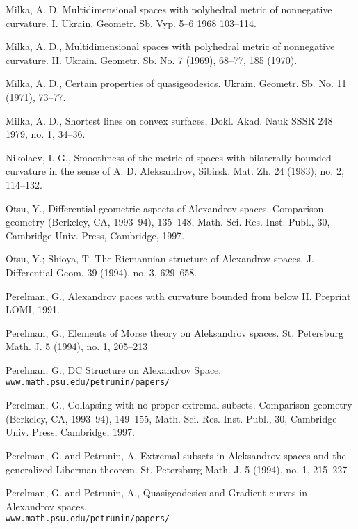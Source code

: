 \documentclass{article}
\begin{document}
\begin{thebibliography}{Bibliography}
Milka, A. D. 
Multidimensional spaces with polyhedral
metric of nonnegative curvature. I. 
Ukrain. Geometr. Sb. Vyp.  5--6 
1968 103--114. 

Milka, A. D., 
Multidimensional spaces with polyhedral
metric of nonnegative curvature. II. 
Ukrain. Geometr. Sb. No. 7
(1969), 68--77, 185 (1970).

Milka, A. D., 
Certain properties of quasigeodesics. 
Ukrain. Geometr. Sb. No. 11 (1971), 73--77.

Milka, A. D., 
Shortest lines on convex surfaces,  
Dokl. Akad. Nauk SSSR  {248}  {1979}, {no. 1}, {34--36}.


Nikolaev, I. G., 
Smoothness of the metric of spaces with bilaterally bounded curvature
in the sense of A. D. Aleksandrov, 
Sibirsk. Mat. Zh. 24 (1983), no. 2, 114--132.

Otsu, Y.,
Differential geometric aspects of Alexandrov spaces.  
Comparison
geometry (Berkeley, CA, 1993--94),  
135--148, Math. Sci. Res. Inst. Publ., 30,
Cambridge Univ. Press, Cambridge, 1997.

Otsu, Y.; Shioya, T. The Riemannian structure of Alexandrov spaces.  J.
Differential Geom.  39  (1994),  no. 3, 629--658.

Perelman, G., 
Alexandrov paces with curvature
bounded from below II. 
Preprint LOMI, 1991.

Perelman, G., 
Elements of Morse theory on
Aleksandrov spaces.  St. Petersburg Math. J.  5  (1994),  no. 1, 205--213

Perelman, G., 
DC Structure on Alexandrov Space,\\ 
{\tt www.math.psu.edu/petrunin/papers/}

Perelman, G., 
Collapsing with no proper
extremal subsets.  Comparison geometry (Berkeley, CA, 1993--94),  149--155,
Math. Sci. Res. Inst. Publ., 30, Cambridge Univ. Press, Cambridge, 1997.

Perelman, G. and   Petrunin, A. 
Extremal subsets in Aleksandrov spaces and the generalized Liberman theorem.
St. Petersburg Math. J.  5  (1994),  no. 1, 215--227

Perelman, G. and  Petrunin, A., Quasigeodesics and Gradient curves in Alexandrov spaces.\\ {\tt www.math.psu.edu/petrunin/papers/}


\end{thebibliography}
\end{document}
